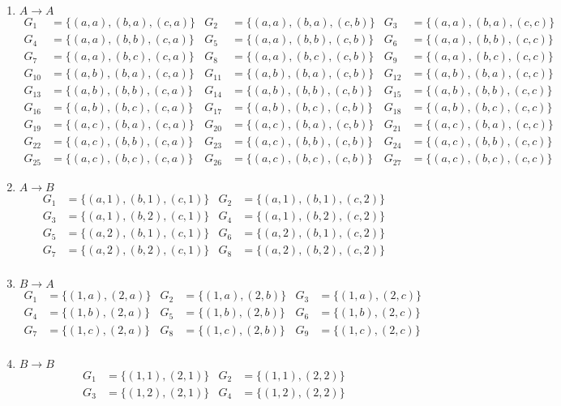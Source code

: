 \documentclass{alex_hü}
\begin{document}
	\begin{enumerate}
		\item $A \to A$
		\begin{align*}
			G_{1} &= \{(a,a),(b,a),(c,a)\} 
			&G_{2} &= \{(a,a),(b,a),(c,b)\}
			&G_{3} &= \{(a,a),(b,a),(c,c)\} \\
			G_{4} &= \{(a,a),(b,b),(c,a)\}
			&G_{5} &= \{(a,a),(b,b),(c,b)\}
			&G_{6} &= \{(a,a),(b,b),(c,c)\} \\
			G_{7} &= \{(a,a),(b,c),(c,a)\}
			&G_{8} &= \{(a,a),(b,c),(c,b)\} 
			&G_{9} &= \{(a,a),(b,c),(c,c)\} \\
			G_{10} &= \{(a,b),(b,a),(c,a)\} 
			&G_{11} &= \{(a,b),(b,a),(c,b)\}
			&G_{12} &= \{(a,b),(b,a),(c,c)\} \\
			G_{13} &= \{(a,b),(b,b),(c,a)\}
			&G_{14} &= \{(a,b),(b,b),(c,b)\} 
			&G_{15} &= \{(a,b),(b,b),(c,c)\} \\
			G_{16} &= \{(a,b),(b,c),(c,a)\} 
			&G_{17} &= \{(a,b),(b,c),(c,b)\}
			&G_{18} &= \{(a,b),(b,c),(c,c)\} \\
			G_{19} &= \{(a,c),(b,a),(c,a)\}
			&G_{20} &= \{(a,c),(b,a),(c,b)\} 
			&G_{21} &= \{(a,c),(b,a),(c,c)\} \\
			G_{22} &= \{(a,c),(b,b),(c,a)\} 
			&G_{23} &= \{(a,c),(b,b),(c,b)\}
			&G_{24} &= \{(a,c),(b,b),(c,c)\} \\
			G_{25} &= \{(a,c),(b,c),(c,a)\}
			&G_{26} &= \{(a,c),(b,c),(c,b)\} 
			&G_{27} &= \{(a,c),(b,c),(c,c)\}
		\end{align*}
		
		\item $A \to B$
			\begin{align*}
				G_{1} &= \{(a,1),(b,1),(c,1)\}
				&G_{2} &= \{(a,1),(b,1),(c,2)\} \\
				G_{3} &= \{(a,1),(b,2),(c,1)\}
				&G_{4} &= \{(a,1),(b,2),(c,2)\} \\
				G_{5} &= \{(a,2),(b,1),(c,1)\}
				&G_{6} &= \{(a,2),(b,1),(c,2)\} \\
				G_{7} &= \{(a,2),(b,2),(c,1)\}
				&G_{8} &= \{(a,2),(b,2),(c,2)\} \\
			\end{align*}	
		
		\item $B \to A$
			\begin{align*}
				G_{1} &= \{(1,a),(2,a)\}
				&G_{2} &= \{(1,a),(2,b)\}
				&G_{3} &= \{(1,a),(2,c)\} \\
				G_{4} &= \{(1,b),(2,a)\}
				&G_{5} &= \{(1,b),(2,b)\}
				&G_{6} &= \{(1,b),(2,c)\} \\
				G_{7} &= \{(1,c),(2,a)\}
				&G_{8} &= \{(1,c),(2,b)\}
				&G_{9} &= \{(1,c),(2,c)\} \\
			\end{align*}
		
		\item $B \to B$
			\begin{align*}
				G_{1} &= \{(1,1),(2,1)\}
				&G_{2} &= \{(1,1),(2,2)\} \\
				G_{3} &= \{(1,2),(2,1)\}
				&G_{4} &= \{(1,2),(2,2)\} \\
			\end{align*}
		
	\end{enumerate}
\end{document}
